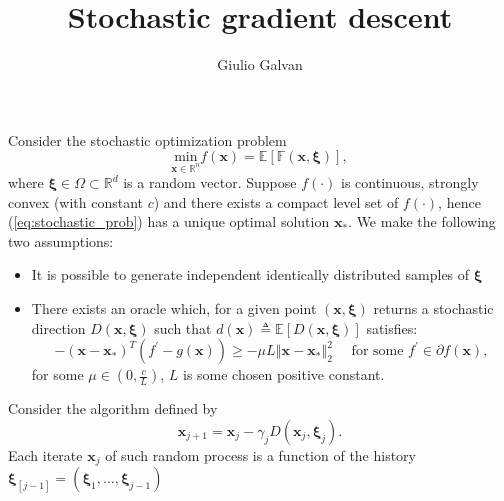 \documentclass{article}
\title{Stochastic gradient descent}
\author{Giulio Galvan}
\renewcommand{\vec}[1]{\boldsymbol{#1}}
\newcommand{\norm}[1]{\left\Vert #1 \right\Vert}
\newcommand{\defeq}{\triangleq}
\begin{document}
	\maketitle
\noindent
Consider the stochastic optimization problem 
\begin{equation}
	\underset{\vec{x} \in \mathbb{R}^n}{\text{min}} f(\vec{x}) = \mathbb{E[F(\vec{x}, \vec{\xi})]},
	\label{eq:stochastic_prob}
\end{equation}
where $\vec{\xi} \in \Omega \subset \mathbb{R}^d$ is a random vector.
Suppose $f(\cdot)$ is continuous, strongly convex (with constant $c$) and there exists a compact level set of $f(\cdot)$, hence (\ref{eq:stochastic_prob}) has a unique optimal solution $\vec{x}_*$. We make the following two assumptions:
\begin{itemize}
	\item	It is possible to generate independent identically distributed samples of $\vec{\xi}$
	\item There exists an oracle which, for a given point $(\vec{x}, \vec{\xi})$ returns a stochastic direction $D(\vec{x}, \vec{\xi})$ such that $d(\vec{x})\defeq\mathbb{E}[D(\vec{x}, \vec{\xi})]$ satisfies:
	\begin{equation}
	-(\vec{x}-\vec{x}_*)^T (f^{\prime} -g(\vec{x})) \geq -\mu L \norm{\vec{x}-\vec{x}_*}^2_2\quad \text{ for some } f^\prime \in \partial f(\vec{x}),
	\label{eq:angular_condition}
	\end{equation}
	for some $\mu \in (0,\frac{c}{L}) $, $L$ is some chosen positive constant.
\end{itemize}
Consider the algorithm defined by
\begin{equation}
	\vec{x}_{j+1} = \vec{x}_j -\gamma_j D(\vec{x}_j,\vec{\xi}_j).
	\label{eq:stochastic_algo}
\end{equation}
Each iterate $\vec{x}_j$ of such random process is a function of the history $\vec{\xi}_{[j-1]}=(\vec{\xi}_1,\dots, \vec{\xi}_{j-1})$
\end{document}
